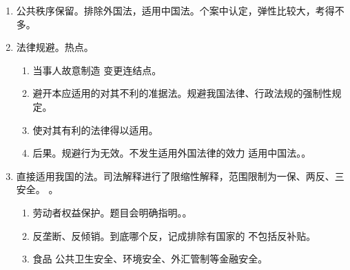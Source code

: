 \begin{enumerate}
\begin{enumerate}
          \item 无法查明 \yjt 直接用中国法。不是查不来就查下一个准据法！！
                \begin{kk}{无法查明的认定}
                  \begin{enumerate}
                    \item 当事人查。合理期限内 + 无正当理由 + 不能提供 = 视为无法查明。。
                    \item 审案机关查。穷尽所有途径。当家机协使领馆，外驻我领非途径。
                          当事人、专家/机构、司法协助协定、我国驻该国使领馆、该国驻我国使馆。
                  \end{enumerate}
                \end{kk}
          \item {}。
          \item 不是证据的提供方，不是证人、鉴定人、专家。身份是有专门知识的人/专家辅助人 \yjt 有争议。
        \end{enumerate}
  \item 公共秩序保留。排除外国法，适用中国法。个案中认定，弹性比较大，考得不多。
  \item 法律规避。热点。
        \begin{enumerate}
          \item 当事人故意制造 \hz 变更连结点。
          \item 避开本应适用的对其不利的准据法。规避我国法律、行政法规的强制性规定。
          \item 使对其有利的法律得以适用。
          \item 后果。\yi 规避行为无效。\er 不发生适用外国法律的效力 \yjt 适用中国法。。
        \end{enumerate}
  \item 直接适用我国的法。司法解释进行了限缩性解释，范围限制为一保、两反、三安全。
        。
        \begin{enumerate}
          \item 劳动者权益保护。题目会明确指明。。
          \item 反垄断、反倾销。到底哪个反，记成排除有国家的 \yjt 不包括反补贴。
          \item 食品 \hz 公共卫生安全、环境安全、外汇管制等金融安全。
        \end{enumerate}
\end{enumerate}
